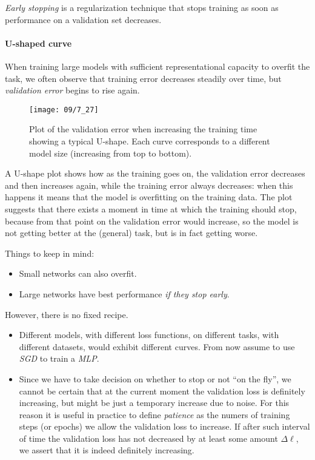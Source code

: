 
\emph{Early stopping} is a regularization technique that stops training as soon as performance on a validation set decreases.

\paragraph{U-shaped curve}
When training large models with sufficient representational capacity to overfit
the task, we often observe that training error decreases steadily over time, but
\emph{validation error} begins to rise again.
\begin{figure}[H]
    \centering
    \texttt{[image: 09/7\_27]}
    \caption{Plot of the validation error when increasing the training time showing a typical U-shape. Each curve corresponds to a different model size (increasing from top to bottom).}	
\end{figure}
A U-shape plot shows how as the training goes on, the validation error decreases and then increases again, while the training error always decreases: when this happens it means that the model is overfitting on the training data.
The plot suggests that there exists a moment in time at which the training should stop, because from that point on the validation error would increase, so the model is not getting better at the (general) task, but is in fact getting worse. 

Things to keep in mind:
\begin{itemize}
    \item Small networks can also overfit.
    \item Large networks have best performance \emph{if they stop early}.
\end{itemize}

However, there is no fixed recipe.
\begin{itemize}
    \item Different models, with different loss functions, on different tasks, with different datasets, would exhibit different curves. From now assume to use \emph{SGD} to train a \emph{MLP}.
    \item Since we have to take decision on whether to stop or not ``on the fly'', we cannot be certain that at the current moment the validation loss is definitely increasing, but might be just a temporary increase due to noise. For this reason it is useful in practice to define \emph{patience} as the numers of training steps (or epochs) we allow the validation loss to increase. If after such interval of time the validation loss has not decreased by at least some amount $\Delta \ell$, we assert that it is indeed definitely increasing.
\end{itemize}

